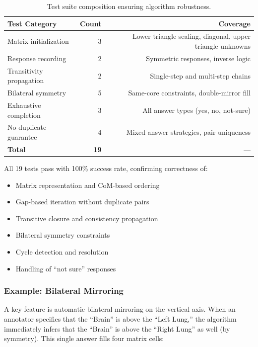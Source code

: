 \documentclass[12pt,a4paper]{article}
\begin{document}
\begin{table}[H]
  \centering
  \begin{tabular}{lrr}
    \toprule
    \textbf{Test Category} & \textbf{Count} & \textbf{Coverage} \\
    \midrule
    Matrix initialization & 3 & Lower triangle sealing, diagonal, upper triangle unknowns \\
    Response recording & 2 & Symmetric responses, inverse logic \\
    Transitivity propagation & 2 & Single-step and multi-step chains \\
    Bilateral symmetry & 5 & Same-core constraints, double-mirror fill \\
    Exhaustive completion & 3 & All answer types (yes, no, not-sure) \\
    No-duplicate guarantee & 4 & Mixed answer strategies, pair uniqueness \\
    \midrule
    \textbf{Total} & \textbf{19} & — \\
    \bottomrule
  \end{tabular}
  \caption{Test suite composition ensuring algorithm robustness.}
\end{table}

All 19 tests pass with 100\% success rate, confirming correctness of:
\begin{itemize}
  \item Matrix representation and CoM-based ordering
  \item Gap-based iteration without duplicate pairs
  \item Transitive closure and consistency propagation
  \item Bilateral symmetry constraints
  \item Cycle detection and resolution
  \item Handling of ``not sure'' responses
\end{itemize}

\subsubsection{Example: Bilateral Mirroring}

A key feature is automatic bilateral mirroring on the vertical axis. When an annotator specifies that the ``Brain'' is above the ``Left Lung,'' the algorithm immediately infers that the ``Brain'' is above the ``Right Lung'' as well (by symmetry). This single answer fills four matrix cells:
\end{document}
